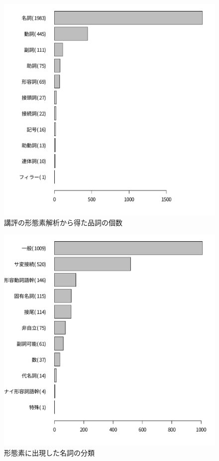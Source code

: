 \documentclass[submit]{ipsj}
\begin{document}
\begin{figure}
  \begin{center}
   \includegraphics[width=0.8\columnwidth]{R/figure/hinshi.pdf}
  \end{center}
  \caption{講評の形態素解析から得た品詞の個数}
  \label{fig:品詞の個数}
\end{figure}

\begin{figure}
  \begin{center}
   \includegraphics[width=0.8\columnwidth]{R/figure/meishi.pdf}
  \end{center}
  \caption{形態素に出現した名詞の分類}
  \label{fig:名詞の細分類}
\end{figure}
\end{document}
